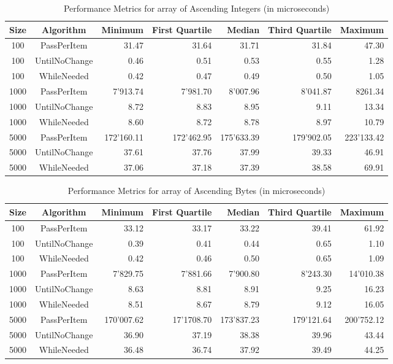 \documentclass{article}
\begin{document}
\begin{table}[htbp]
    \centering
    \begin{tabular}{ccrrrrr}
        \toprule
        \textbf{Size} & \textbf{Algorithm} & \textbf{Minimum} & \textbf{First Quartile} & \textbf{Median} & \textbf{Third Quartile} & \textbf{Maximum} \\
        \midrule
        100 & PassPerItem & 31.47 & 31.64 & 31.71 & 31.84 & 47.30 \\
        100 & UntilNoChange & 0.46 & 0.51 & 0.53 & 0.55 & 1.28 \\
        100 & WhileNeeded & 0.42 & 0.47 & 0.49 & 0.50 & 1.05 \\
        1000 & PassPerItem & 7'913.74 & 7'981.70 & 8'007.96 & 8'041.87 & 8261.34 \\
        1000 & UntilNoChange & 8.72 & 8.83 & 8.95 & 9.11 & 13.34 \\
        1000 & WhileNeeded & 8.60 & 8.72 & 8.78 & 8.97 & 10.79 \\
        5000 & PassPerItem & 172'160.11 & 172'462.95 & 175'633.39 & 179'902.05 & 223'133.42 \\
        5000 & UntilNoChange & 37.61 & 37.76 & 37.99 & 39.33 & 46.91 \\
        5000 & WhileNeeded & 37.06 & 37.18 & 37.39 & 38.58 & 69.91 \\
        \bottomrule
    \end{tabular}
    \caption{Performance Metrics for array of Ascending Integers (in microseconds)}
    \label{tab:performance_5}
\end{table}

\begin{table}[htbp]
    \centering
    \begin{tabular}{ccrrrrr}
        \toprule
        \textbf{Size} & \textbf{Algorithm} & \textbf{Minimum} & \textbf{First Quartile} & \textbf{Median} & \textbf{Third Quartile} & \textbf{Maximum} \\
        \midrule
        100 & PassPerItem & 33.12 & 33.17 & 33.22 & 39.41 & 61.92 \\
        100 & UntilNoChange & 0.39 & 0.41 & 0.44 & 0.65 & 1.10 \\
        100 & WhileNeeded & 0.42 & 0.46 & 0.50 & 0.65 & 1.09 \\
        1000 & PassPerItem & 7'829.75 & 7'881.66 & 7'900.80 & 8'243.30 & 14'010.38 \\
        1000 & UntilNoChange & 8.63 & 8.81 & 8.91 & 9.25 & 16.23 \\
        1000 & WhileNeeded & 8.51 & 8.67 & 8.79 & 9.12 & 16.05 \\
        5000 & PassPerItem & 170'007.62 & 17'1708.70 & 173'837.23 & 179'121.64 & 200'752.12 \\
        5000 & UntilNoChange & 36.90 & 37.19 & 38.38 & 39.96 & 43.44 \\
        5000 & WhileNeeded & 36.48 & 36.74 & 37.92 & 39.49 & 44.25 \\
        \bottomrule
    \end{tabular}
    \caption{Performance Metrics for array of Ascending Bytes (in microseconds)}
    \label{tab:performance_6}
\end{table}
\end{document}
